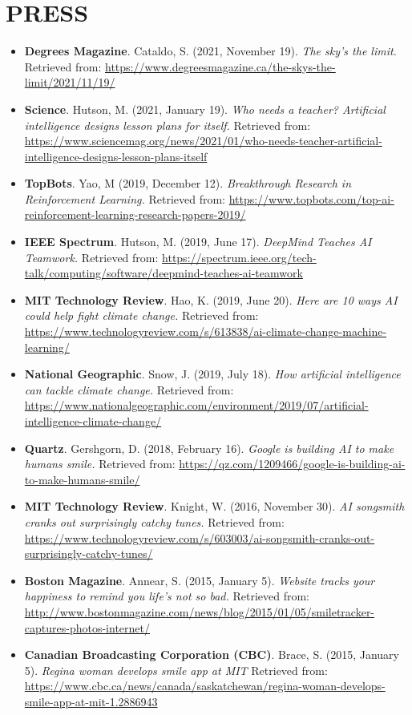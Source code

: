 \documentclass[paper=letter,fontsize=11pt]{scrartcl} %
\newcommand{\NewPart}[2]{\section*{\uppercase{#1} #2}}
\newcommand{\PressEntry}[5]{
        \noindent \textbf{#5}. #1 (#2). \textit{#3} Retrieved from: \url{#4}}
\begin{document}
\NewPart{Press}{}
\begin{itemize}
\item\PressEntry{Cataldo, S.}{2021, November 19}{The sky’s the limit.}{https://www.degreesmagazine.ca/the-skys-the-limit/2021/11/19/}{Degrees Magazine}

\item\PressEntry{Hutson, M.}{2021, January 19}{Who needs a teacher? Artificial intelligence designs lesson plans for itself.}{https://www.sciencemag.org/news/2021/01/who-needs-teacher-artificial-intelligence-designs-lesson-plans-itself}{Science}

\item\PressEntry{Yao, M}{2019, December 12}{Breakthrough Research in Reinforcement Learning.}{https://www.topbots.com/top-ai-reinforcement-learning-research-papers-2019/}{TopBots}

\item\PressEntry{Hutson, M.}{2019, June 17}{DeepMind Teaches AI Teamwork.}{https://spectrum.ieee.org/tech-talk/computing/software/deepmind-teaches-ai-teamwork}{IEEE Spectrum}

\item\PressEntry{Hao, K.}{2019, June 20}{Here are 10 ways AI could help fight climate change.}{https://www.technologyreview.com/s/613838/ai-climate-change-machine-learning/}{MIT Technology Review}

\item\PressEntry{Snow, J.}{2019, July 18}{How artificial intelligence can tackle climate change.}{https://www.nationalgeographic.com/environment/2019/07/artificial-intelligence-climate-change/}{National Geographic}

\item\PressEntry{Gershgorn, D.}{2018, February 16}{Google is building AI to make humans smile.}{https://qz.com/1209466/google-is-building-ai-to-make-humans-smile/}{Quartz}

\item\PressEntry{Knight, W.}{2016, November 30}{AI songsmith cranks out surprisingly catchy tunes.}{https://www.technologyreview.com/s/603003/ai-songsmith-cranks-out-surprisingly-catchy-tunes/}{MIT Technology Review}

\item\PressEntry{Annear, S.}{2015, January 5}{Website tracks your happiness to remind you life’s not so bad.}{http://www.bostonmagazine.com/news/blog/2015/01/05/smiletracker-captures-photos-internet/}{Boston Magazine}

\item\PressEntry{Brace, S.}{2015, January 5}{Regina woman develops smile app at MIT}
{https://www.cbc.ca/news/canada/saskatchewan/regina-woman-develops-smile-app-at-mit-1.2886943}{Canadian Broadcasting Corporation (CBC)}

\end{itemize}
\end{document}
